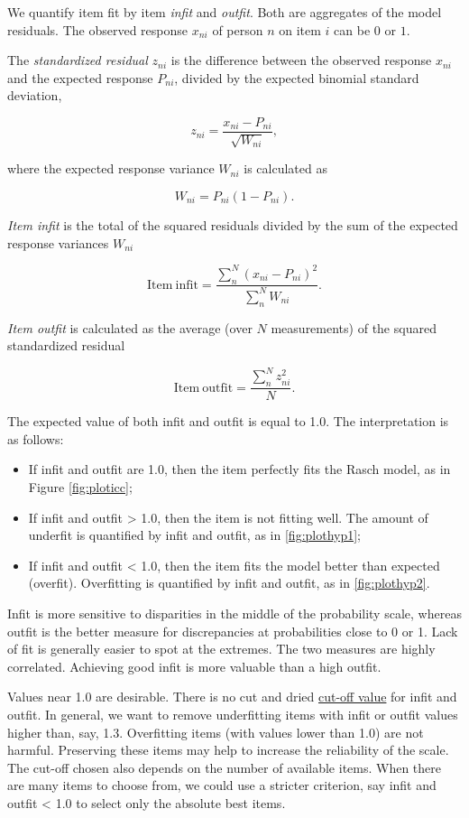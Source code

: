 \documentclass[
]{book}
\begin{document}
We quantify item fit by item \emph{infit} and \emph{outfit}. Both are aggregates of the model residuals. The observed response \(x_{ni}\) of person \(n\) on item \(i\) can be \(0\) or \(1\).

The \emph{standardized residual} \(z_{ni}\) is the difference between the observed response \(x_{ni}\) and the expected response \(P_{ni}\), divided by the expected binomial standard deviation,

\[z_{ni} = \frac{x_{ni}-P_{ni}}{\sqrt{W_{ni}}},\]

where the expected response variance \(W_{ni}\) is calculated as

\[W_{ni} = P_{ni}(1-P_{ni}).\]

\emph{Item infit} is the total of the squared residuals divided by the sum of the expected response variances \(W_{ni}\)

\[\mathrm{Item\ infit} = \frac{\sum_{n}^N (x_{ni}-P_{ni})^2}{\sum_n^N W_{ni}}.\]

\emph{Item outfit} is calculated as the average (over \(N\) measurements) of the squared standardized residual

\[\mathrm{Item\ outfit} = \frac{\sum_{n}^N z_{ni}^2}{N}.\]

The expected value of both infit and outfit is equal to 1.0. The interpretation is as follows:

\begin{itemize}
\item
  If infit and outfit are 1.0, then the item perfectly fits the Rasch model, as in Figure \ref{fig:ploticc};
\item
  If infit and outfit \textgreater{} 1.0, then the item is not fitting well. The amount of underfit is quantified by infit and outfit, as in \ref{fig:plothyp1};
\item
  If infit and outfit \textless{} 1.0, then the item fits the model better than expected (overfit). Overfitting is quantified by infit and outfit, as in \ref{fig:plothyp2}.
\end{itemize}

Infit is more sensitive to disparities in the middle of the probability scale, whereas outfit is the better measure for discrepancies at probabilities close to 0 or 1. Lack of fit is generally easier to spot at the extremes. The two measures are highly correlated. Achieving good infit is more valuable than a high outfit.

Values near 1.0 are desirable. There is no cut and dried \href{https://www.rasch.org/rmt/rmt83b.htm}{cut-off value} for infit and outfit. In general, we want to remove underfitting items with infit or outfit values higher than, say, 1.3. Overfitting items (with values lower than 1.0) are not harmful. Preserving these items may help to increase the reliability of the scale. The cut-off chosen also depends on the number of available items. When there are many items to choose from, we could use a stricter criterion, say infit and outfit \textless{} 1.0 to select only the absolute best items.
\end{document}
